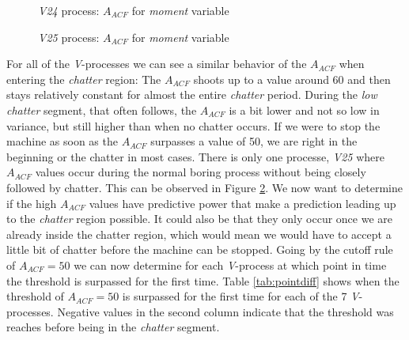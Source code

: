 \documentclass[12 pt]{scrartcl}
\begin{document}
\begin{figure}[p]
  \caption{\emph{V24} process: $A_{ACF}$ for \emph{moment} variable}
  \label{fig:v24-moment-aacf}
\end{figure}


\begin{figure}[p]
  \caption{\emph{V25} process: $A_{ACF}$ for \emph{moment} variable}
  \label{fig:v25-moment-aacf}
\end{figure}

For all of the \emph{V}-processes we can see a similar behavior of the $A_{ACF}$ when entering the \emph{chatter} region: The $A_{ACF}$ shoots up to a value around 60 and then stays relatively constant for almost the entire \emph{chatter} period. During the \emph{low chatter} segment, that often follows, the $A_{ACF}$ is a bit lower and not so low in variance, but still higher than when no chatter occurs. If we were to stop the machine as soon as the $A_{ACF}$ surpasses a value of 50, we are right in the beginning or the chatter in most cases. There is only one processe, \emph{V25} where $A_{ACF}$ values occur during the normal boring process without being closely followed by chatter. This can be observed in Figure \ref{fig:v25-moment-aacf}.
We now want to determine if the high $A_{ACF}$ values have predictive power that make a prediction leading up to the \emph{chatter} region possible. It could also be that they only occur once we are already inside the chatter region, which would mean we would have to accept a little bit of chatter before the machine can be stopped.
Going by the cutoff rule of $A_{ACF} = 50$ we can now determine for each \emph{V}-process at which point in time the threshold is surpassed for the first time.
Table \ref{tab:pointdiff} shows when the threshold of $A_{ACF} = 50$ is surpassed for the first time for each of the 7 \emph{V}-processes. Negative values in the second column indicate that the threshold was reaches before being in the \emph{chatter} segment.
\end{document}
